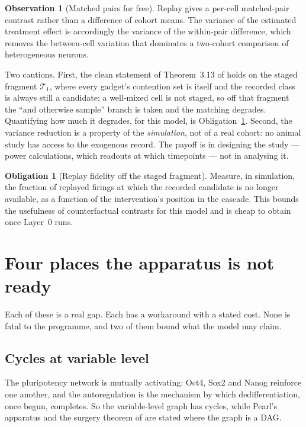 \documentclass[11pt,a4paper]{article}
\theoremstyle{plain}
\theoremstyle{definition}
\newtheorem{obligation}[theorem]{Obligation}
\newtheorem{observation}[theorem]{Observation}
\theoremstyle{remark}
\begin{document}
\begin{observation}[Matched pairs for free]\label{obs:pairs}
Replay gives a per-cell matched-pair contrast rather than a difference of
cohort means. The variance of the estimated treatment effect is accordingly
the variance of the within-pair difference, which removes the between-cell
variation that dominates a two-cohort comparison of heterogeneous neurons.
\end{observation}

Two cautions. First, the clean statement of Theorem~3.13 of
\cite{Interventions} holds on the staged fragment $\mathcal{T}_1$, where every
gadget's contention set is itself and the recorded class is always still a
candidate; a well-mixed cell is not staged, so off that fragment the ``and
otherwise sample'' branch is taken and the matching degrades. Quantifying how
much it degrades, for this model, is Obligation~\ref{ob:replay}. Second, the
variance reduction is a property of the \emph{simulation}, not of a real
cohort: no animal study has access to the exogenous record. The payoff is in
designing the study --- power calculations, which readouts at which timepoints
--- not in analysing it.

\begin{obligation}[Replay fidelity off the staged fragment]\label{ob:replay}
Measure, in simulation, the fraction of replayed firings at which the recorded
candidate is no longer available, as a function of the intervention's position
in the cascade. This bounds the usefulness of counterfactual contrasts for
this model and is cheap to obtain once Layer~0 runs.
\end{obligation}

\section{Four places the apparatus is not ready}\label{sec:gaps}

Each of these is a real gap. Each has a workaround with a stated cost. None is
fatal to the programme, and two of them bound what the model may claim.

\subsection{Cycles at variable level}

The pluripotency network is mutually activating: Oct4, Sox2 and Nanog
reinforce one another, and the autoregulation is the mechanism by which
dedifferentiation, once begun, completes. So the variable-level graph has
cycles, while Pearl's apparatus and the surgery theorem of
\cite{Interventions} are stated where the graph is a DAG.
\end{document}

